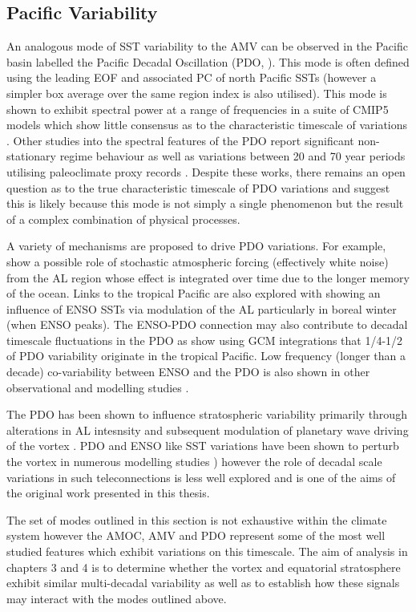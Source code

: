 \subsection{Pacific Variability}
\label{sec:PDO}
An analogous mode of SST variability to the AMV can be observed in the Pacific basin labelled the Pacific Decadal Oscillation (PDO, \cite{mantuaPacific1997a}). This mode is often defined using the leading EOF and associated PC of north Pacific SSTs (however a simpler box average over the same region index is also utilised). This mode is shown to exhibit spectral power at a range of frequencies in a suite of CMIP5 models which show little consensus as to the characteristic timescale of variations \cite{newmanPacific2016}. Other studies into the spectral features of the PDO report significant non-stationary regime behaviour \citep{overlandRegime2006, flemingNonuniqueness2014} as well as variations between 20 and 70 year periods utilising paleoclimate proxy records \citep{biondiNorth2001}. Despite these works, there remains an open question as to the true characteristic timescale of PDO variations and \cite{newmanPacific2016} suggest this is likely because this mode is not simply a single phenomenon but the result of a complex combination of physical processes. 

A variety of mechanisms are proposed to drive PDO variations. For example, \cite{frankignoulStochastic1977} show a possible role of stochastic atmospheric forcing (effectively white noise) from the AL region whose effect is integrated over time due to the longer memory of the ocean. Links to the tropical Pacific are also explored with \cite{strongRole2009} showing an influence of ENSO SSTs via modulation of the AL particularly in boreal winter (when ENSO peaks). The ENSO-PDO connection may also contribute to decadal timescale fluctuations in the PDO as \cite{alexanderAtmospheric2002, alexanderRole2008} show using GCM integrations that 1/4-1/2 of PDO variability originate in the tropical Pacific. Low frequency (longer than a decade) co-variability between ENSO and the PDO is also shown in other observational and modelling studies \citep{vimontContribution2005, chenENSOLike2015}.

The PDO has been shown to influence stratospheric variability primarily through alterations in AL intesnsity and subsequent modulation of planetary wave driving of the vortex \citep{krenWintertime2016b,Kang2017,huDecadal2018b}. PDO and ENSO like SST variations have been shown to perturb the vortex in numerous modelling studies \citep{krenWintertime2016b,garcia-herreraPropagation2006b}) however the role of decadal scale variations in such teleconnections is less well explored and is one of the aims of the original work presented in this thesis.

The set of modes outlined in this section is not exhaustive within the climate system however the AMOC, AMV and PDO represent some of the most well studied features which exhibit variations on this timescale. The aim of analysis in chapters 3 and 4 is to determine whether the vortex and equatorial stratosphere exhibit similar multi-decadal variability as well as to establish how these signals may interact with the modes outlined above.



